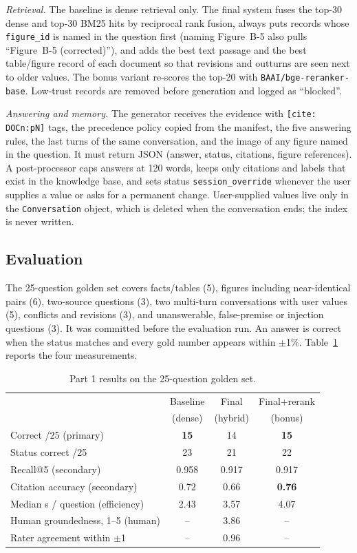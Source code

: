 \documentclass[10pt,twocolumn,letterpaper]{article}
\begin{document}
\emph{Retrieval.} The baseline is dense retrieval only. The final system fuses the top-30 dense and top-30 BM25 hits by
reciprocal rank fusion, always puts records whose \texttt{figure\_id} is named in the question first (naming
Figure~B-5 also pulls ``Figure~B-5 (corrected)''), and adds the best text passage and the best table/figure record of each
document so that revisions and outturns are seen next to older values. The bonus variant re-scores the top-20 with
\texttt{BAAI/bge-reranker-base}. Low-trust records are removed before generation and logged as ``blocked''.

\emph{Answering and memory.} The generator receives the evidence with \texttt{[cite: DOCn:pN]} tags, the precedence policy
copied from the manifest, the five answering rules, the last turns of the same conversation, and the image of any figure
named in the question. It must return JSON (answer, status, citations, figure references). A post-processor caps answers
at 120 words, keeps only citations and labels that exist in the knowledge base, and sets status
\texttt{session\_override} whenever the user supplies a value or asks for a permanent change. User-supplied values live
only in the \texttt{Conversation} object, which is deleted when the conversation ends; the index is never written.

\subsection{Evaluation}
The 25-question golden set covers facts/tables (5), figures including near-identical pairs (6), two-source questions
(3), two multi-turn conversations with user values (5), conflicts and revisions (3), and unanswerable, false-premise or
injection questions (3). It was committed before the evaluation run. An answer is correct when the status matches and
every gold number appears within $\pm$1\%. Table~\ref{tab:p1} reports the four measurements.

\begin{table}[t]\centering\footnotesize
\caption{Part 1 results on the 25-question golden set.}\label{tab:p1}
\begin{tabular}{@{}lccc@{}}\toprule
 & Baseline & Final & Final+rerank\\
 & (dense) & (hybrid) & (bonus)\\\midrule
Correct /25 (primary) & \textbf{15} & 14 & \textbf{15}\\
Status correct /25 & 23 & 21 & 22\\
Recall@5 (secondary) & 0.958 & 0.917 & 0.917\\
Citation accuracy (secondary) & 0.72 & 0.66 & \textbf{0.76}\\
Median s / question (efficiency) & 2.43 & 3.57 & 4.07\\\midrule
Human groundedness, 1--5 (human) & -- & 3.86 & --\\
Rater agreement within $\pm$1 & -- & 0.96 & --\\\bottomrule
\end{tabular}
\end{table}
\end{document}
